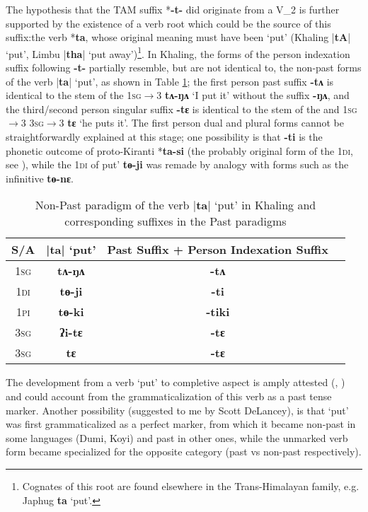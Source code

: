 \documentclass[oneside,a4paper,11pt]{article}
\newcommand{\ipa}[1]{{\phon\textbf{#1}}}
\newcommand{\dhatu}[2]{|\ipa{#1}| `#2'}
\begin{document}
The hypothesis that the TAM suffix *\ipa{-t-} did originate from a V_2 is further supported by the existence of a verb root which could be the source of this suffix:the verb *\ipa{ta}, whose original meaning must have been `put' (Khaling \dhatu{tA}{put}, Limbu \dhatu{tha}{put away})\footnote{Cognates of this root are found elsewhere in the Trans-Himalayan family, e.g. Japhug \ipa{ta} `put'.}.  In Khaling, the forms of the person indexation suffix  following \ipa{-t-} partially resemble, but are not identical to, the non-past forms of the verb \dhatu{ta}{put}, as shown in Table \ref{tab:tANA}; the first person past suffix \ipa{-tʌ} is identical to the stem of the \textsc{1sg$\rightarrow$3}  \ipa{tʌ-ŋʌ} `I put it' without the suffix \ipa{-ŋʌ}, and the third/second person singular suffix \ipa{-tɛ} is identical to the stem of the and \textsc{1sg$\rightarrow$3} \textsc{3sg$\rightarrow$3}  \ipa{tɛ} `he puts it'. The first person dual and plural forms cannot be straightforwardly explained at this stage; one possibility is that \ipa{-ti} is the phonetic outcome of proto-Kiranti *\ipa{ta-si} (the probably original form of the \textsc{1di}, see \citealt[58]{jacques16tonogenesis}), while the \textsc{1di} of  put' \ipa{tɵ-ji} was remade by analogy with forms such as the infinitive \ipa{tɵ-nɛ}.

\begin{table}[H]
\caption{Non-Past paradigm of the verb \dhatu{ta}{put} in Khaling and corresponding suffixes in the Past paradigms} \centering \label{tab:tANA}
\begin{tabular}{cccc}
\toprule
S/A & \dhatu{ta}{put} & Past Suffix + Person Indexation Suffix \\
\midrule
\textsc{1sg} & \ipa{tʌ-ŋʌ} &  \ipa{-tʌ}  \\
\textsc{1di} & \ipa{tɵ-ji} &  \ipa{-ti}  \\
\textsc{1pi} & \ipa{tɵ-ki} & \ipa{-tiki}  \\
\textsc{3sg} & \ipa{ʔi-tɛ} & \ipa{-tɛ}  \\
\textsc{3sg} & \ipa{tɛ} & \ipa{-tɛ}  \\
\bottomrule
\end{tabular}
\end{table}


The development from a verb `put' to completive aspect is amply attested (\citealt[58]{bybee94TAM}, \citealt[248]{heine-kuteva02}) and could account from the grammaticalization of this verb as a past tense marker. Another possibility (suggested to me by Scott DeLancey), is that `put' was first grammaticalized as a perfect marker, from which it became non-past in some languages (Dumi, Koyi) and past in other ones, while the unmarked verb form became specialized for the opposite category (past vs non-past respectively).
\end{document}
